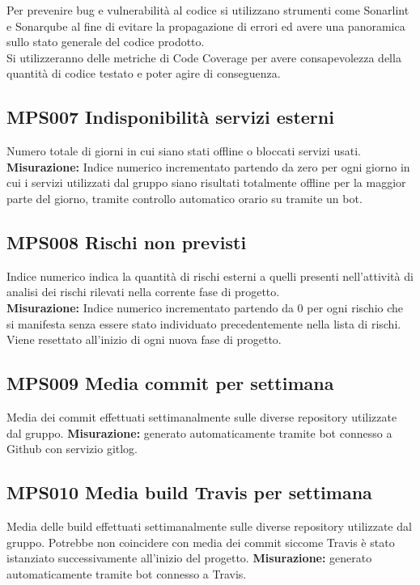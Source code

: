 \documentclass[NormeDiProgetto.tex]{subfiles}
\begin{document}
	Per prevenire bug e vulnerabilità al codice si utilizzano strumenti come Sonarlint e Sonarqube al fine di evitare la propagazione di errori ed avere una panoramica sullo stato generale del codice prodotto.\\
	Si utilizzeranno delle metriche di Code Coverage per avere consapevolezza della quantità di codice testato e poter agire di conseguenza.
	
	\subsection{MPS007 Indisponibilità servizi esterni} Numero totale di giorni in cui siano stati offline o bloccati servizi usati.\\
	\textbf{Misurazione:}
	Indice numerico incrementato partendo da zero per ogni giorno in cui i servizi utilizzati dal gruppo siano risultati totalmente offline per la maggior parte del giorno, tramite controllo automatico orario su  tramite un bot.
	
	\subsection{MPS008 Rischi non previsti} Indice numerico indica la quantità di rischi esterni a quelli presenti nell'attività di analisi dei rischi rilevati nella corrente fase di progetto. \\
	\textbf{Misurazione:}
	Indice numerico incrementato partendo da 0 per ogni rischio che si manifesta senza essere stato individuato precedentemente nella lista di rischi.
	Viene resettato all'inizio di ogni nuova fase di progetto.
	
	\subsection{MPS009 Media commit per settimana} Media dei commit effettuati settimanalmente sulle diverse repository utilizzate dal gruppo.
	\textbf{Misurazione:} generato automaticamente tramite bot connesso a Github con servizio gitlog.
	\subsection{MPS010 Media build Travis per settimana} Media delle build effettuati settimanalmente sulle diverse repository utilizzate dal gruppo. Potrebbe non coincidere con media dei commit siccome Travis è stato istanziato successivamente all'inizio del progetto.
	\textbf{Misurazione:} generato automaticamente tramite bot connesso a Travis. 
\end{document}
